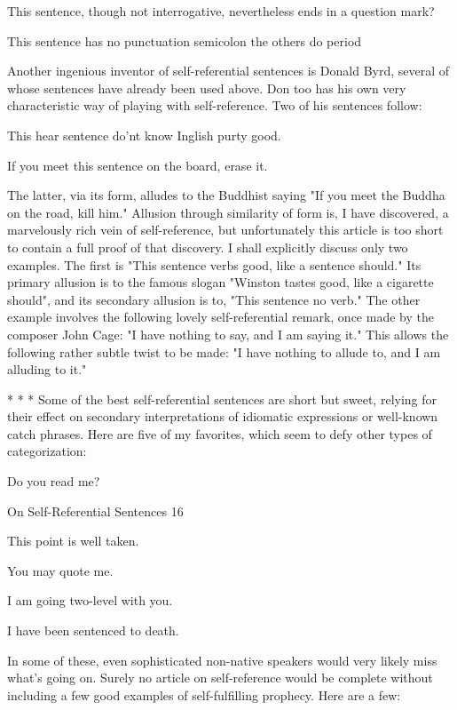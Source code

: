        This sentence, though not interrogative, nevertheless ends in a question mark?

       This sentence has no punctuation semicolon the others do period

       Another ingenious inventor of self-referential sentences is Donald Byrd, several
of whose sentences have already been used above. Don too has his own very
characteristic way of playing with self-reference. Two of his sentences follow:

       This hear sentence do'nt know Inglish purty good.

       If you meet this sentence on the board, erase it.

The latter, via its form, alludes to the Buddhist saying "If you meet the Buddha on the
road, kill him."
        Allusion through similarity of form is, I have discovered, a marvelously rich vein
of self-reference, but unfortunately this article is too short to contain a full proof of that
discovery. I shall explicitly discuss only two examples. The first is "This sentence verbs
good, like a sentence should." Its primary allusion is to the famous slogan "Winston
tastes good, like a cigarette should", and its secondary allusion is to, "This sentence no
verb." The other example involves the following lovely self-referential remark, once
made by the composer John Cage: "I have nothing to say, and I am saying it." This
allows the following rather subtle twist to be made: "I have nothing to allude to, and I am
alluding to it."

                                      *       *       *
Some of the best self-referential sentences are short but sweet, relying for their effect on
secondary interpretations of idiomatic expressions or well-known catch phrases. Here are
five of my favorites, which seem to defy other types of categorization:

       Do you read me?




On Self-Referential Sentences                                                              16

       This point is well taken.

       You may quote me.

       I am going two-level with you.

       I have been sentenced to death.

In some of these, even sophisticated non-native speakers would very likely miss what's
going on.
       Surely no article on self-reference would be complete without including a few
good examples of self-fulfilling prophecy. Here are a few:

